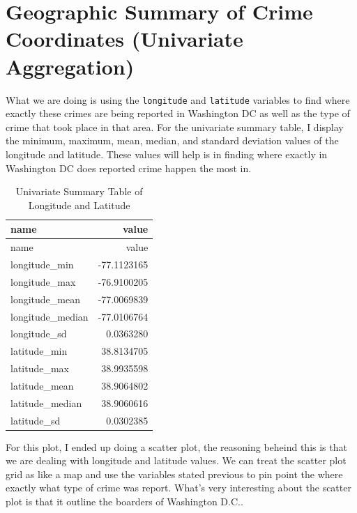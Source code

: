 \documentclass[
]{article}
\begin{document}
\clearpage

\section{Geographic Summary of Crime Coordinates (Univariate
Aggregation)}\label{geographic-summary-of-crime-coordinates-univariate-aggregation}

What we are doing is using the \texttt{longitude} and \texttt{latitude}
variables to find where exactly these crimes are being reported in
Washington DC as well as the type of crime that took place in that area.
For the univariate summary table, I display the minimum, maximum, mean,
median, and standard deviation values of the longitude and latitude.
These values will help is in finding where exactly in Washington DC does
reported crime happen the most in.

\begin{longtable}[]{@{}lr@{}}
\caption{Univariate Summary Table of Longitude and
Latitude}\tabularnewline
\toprule\noalign{}
name & value \\
\midrule\noalign{}
\endfirsthead
\toprule\noalign{}
name & value \\
\midrule\noalign{}
\endhead
\bottomrule\noalign{}
\endlastfoot
longitude\_min & -77.1123165 \\
longitude\_max & -76.9100205 \\
longitude\_mean & -77.0069839 \\
longitude\_median & -77.0106764 \\
longitude\_sd & 0.0363280 \\
latitude\_min & 38.8134705 \\
latitude\_max & 38.9935598 \\
latitude\_mean & 38.9064802 \\
latitude\_median & 38.9060616 \\
latitude\_sd & 0.0302385 \\
\end{longtable}

For this plot, I ended up doing a scatter plot, the reasoning beheind
this is that we are dealing with longitude and latitude values. We can
treat the scatter plot grid as like a map and use the variables stated
previous to pin point the where exactly what type of crime was report.
What's very interesting about the scatter plot is that it outline the
boarders of Washington D.C..
\end{document}
